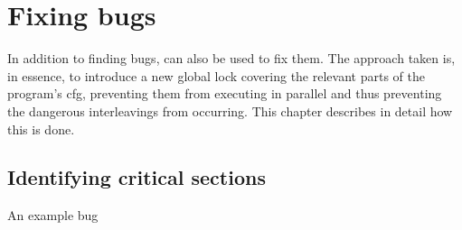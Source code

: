 \chapter{Fixing bugs}
\label{sect:fix_global_lock}

\newcommand{\one}{~\hspace{-1.2pt}1\hspace{3.0pt}~}

In addition to finding bugs, {\technique} can also be used to fix
them.  The approach taken is, in essence, to introduce a new global
lock covering the relevant parts of the program's \gls{cfg},
preventing them from executing in parallel and thus preventing the
dangerous interleavings from occurring.  This chapter describes in
detail how this is done.

\section{Identifying critical sections}
\label{sect:fix:identify}

\begin{sanefig}
  \hspace{-5mm}
  \hspace{-10mm}
  \caption{An example bug}
  \label{fig:fix_bug:complex_local}
\end{sanefig}

